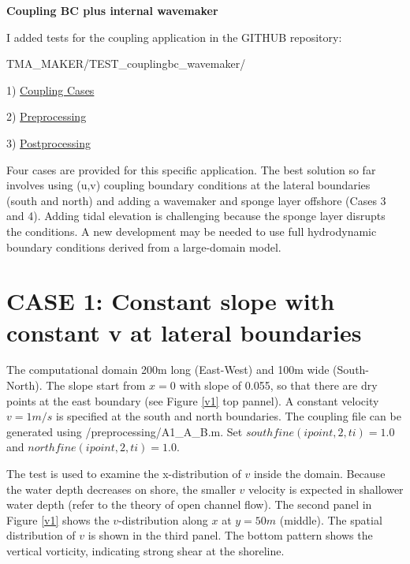 \documentclass[preprint,10pt]{elsarticle}
\begin{document}

\begin{center}
{\bf \Huge Coupling BC plus internal wavemaker}
 \end{center}

I added tests for the coupling application in  the GITHUB repository: 

TMA\_MAKER/TEST\_couplingbc\_wavemaker/

 1) \href{https://github.com/fengyanshi/TMA_MAKER/tree/master/TEST_couplingbc_wavemaker}{Coupling Cases}
 
 2)  \href{https://github.com/fengyanshi/TMA_MAKER/tree/master/TEST_couplingbc_wavemaker/preprocessing}{Preprocessing}

3)  \href{https://github.com/fengyanshi/TMA_MAKER/tree/master/TEST_couplingbc_wavemaker/preprocessing}{Postprocessing}

Four cases are provided for this specific application. The best solution so far involves using (u,v) coupling boundary conditions at the lateral boundaries (south and north) and adding a wavemaker and sponge layer offshore (Cases 3 and 4). Adding tidal elevation is challenging because the sponge layer disrupts the conditions. A new development may be needed to use full hydrodynamic boundary conditions derived from a large-domain model. 

\newpage
\section*{CASE 1: Constant slope with constant v at lateral boundaries}

The computational domain 200m long (East-West) and 100m wide (South-North). The slope start from $x=0$  with slope of 0.055, so that there are dry points at the east boundary (see Figure \ref{v1} top pannel).  A constant velocity $v=1 m/s$ is specified at the south and north boundaries. The coupling file can be generated using /preprocessing/A1\_A\_B.m.  Set $southfine(ipoint,2,ti)=1.0$ and $northfine(ipoint,2,ti)=1.0$. 

The test is used to examine the x-distribution of $v$ inside the domain. Because the water depth decreases on shore, the smaller $v$ velocity is expected in shallower water depth (refer to the theory of open channel flow). The second panel in Figure \ref{v1} shows the $v$-distribution along $x$ at  $y = 50m$ (middle). The spatial distribution of $v$ is shown in the third panel. The bottom pattern shows the vertical vorticity, indicating strong shear at the shoreline. 
  
\end{document}

